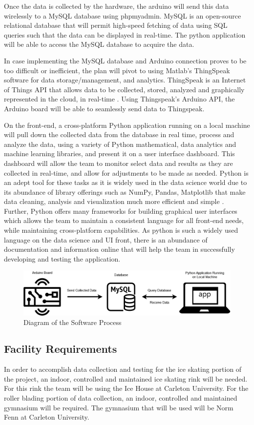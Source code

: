 Once the data is collected by the hardware, the arduino will send this data wirelessly to a MySQL database using phpmyadmin. MySQL is an open-source relational database that will permit high-speed fetching of data using SQL queries such that the data can be displayed in real-time. The python application will be able to access the MySQL database to acquire the data.

In case implementing the MySQL database and Arduino connection proves to be too difficult or inefficient, the plan will pivot to using Matlab’s ThingSpeak software for data storage/management, and analytics. ThingSpeak is an Internet of Things API that allows data to be collected, stored, analyzed and graphically represented in the cloud, in real-time \cite{11}. Using Thingspeak’s Arduino API, the Arduino board will be able to seamlessly send data to Thingspeak.

On the front-end, a cross-platform Python application running on a local machine will pull down the collected data from the database in real time, process and analyze the data, using a variety of Python mathematical, data analytics and machine learning libraries, and present it on a user interface dashboard. This dashboard will allow the team to monitor select data and results as they are collected in real-time, and allow for adjustments to be made as needed. Python is an adept tool for these tasks as it is widely used in the data science world due to its abundance of library offerings such as NumPy, Pandas, Matplotlib that make data cleaning, analysis and visualization much more efficient and simple \cite{11}. Further, Python offers many frameworks for building graphical user interfaces which allows the team to maintain a consistent language for all front-end needs, while maintaining cross-platform capabilities. As python is such a widely used language on the data science and UI front, there is an abundance of documentation and information online that will help the team in successfully developing and testing the application.
\begin{figure}[htbp]
\centering
\includegraphics[width=\textwidth]{Project_Proposal/figs/CapstoneDiagrams.png}
\caption{Diagram of the Software Process}
\label{fig:Software}
\end{figure}
\subsection{Facility Requirements}
In order to accomplish data collection and testing for the ice skating portion of the project, an indoor, controlled and maintained ice skating rink will be needed. For this rink the team will be using the Ice House at Carleton University. For the roller blading portion of data collection, an indoor, controlled and maintained gymnasium will be required. The gymnasium that will be used will be Norm Fenn at Carleton University. 

